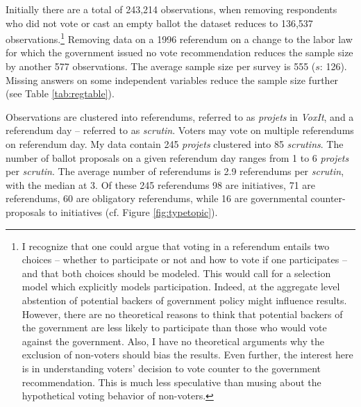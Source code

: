 \documentclass[11pt,a4paper]{article}\usepackage[]{graphicx}\usepackage[]{color}
\begin{document}
    Initially there are a total of 243,214 observations, when removing respondents who did not vote or cast an empty ballot the dataset reduces to 136,537 
    observations.\footnote{I recognize that one could argue that voting in a referendum entails two choices -- whether to participate or not and how to vote if one participates -- and that both choices should be modeled. This would call for a selection model which explicitly models participation. Indeed, at the aggregate level abstention of potential backers of government policy might influence results. However, there are no theoretical reasons to think that potential backers of the government are less likely to participate than those who would vote against the government. Also, I have no theoretical arguments why the exclusion of non-voters should bias the results. Even further, the interest here is in understanding voters' decision to vote counter to the government recommendation. This is much less speculative than musing about the hypothetical voting behavior of non-voters.} Removing data on a 1996 referendum on a change to the labor law for which the government issued no vote recommendation reduces the sample size by another 577 observations. The average sample size per survey is 555 ($s$: 126). Missing answers on some independent variables reduce the sample size further (see Table \ref{tab:regtable}).
    
    Observations are clustered into referendums, referred to as \textit{projets} in \textit{VoxIt}, and a referendum day -- referred to as \textit{scrutin}. Voters may vote on multiple referendums on referendum day. My data contain 245 \textit{projets} clustered into 85 \textit{scrutins}. The number of ballot proposals on a given referendum day ranges from 1 to 6 \textit{projets} per \textit{scrutin}. The average number of referendums is 2.9 referendums per \textit{scrutin}, with the median at 3. Of these 245 referendums 98 are initiatives, 71 are referendums, 60 are obligatory referendums, while 16 are governmental counter-proposals to initiatives (cf. Figure \ref{fig:typetopic}).
    
\end{document}
